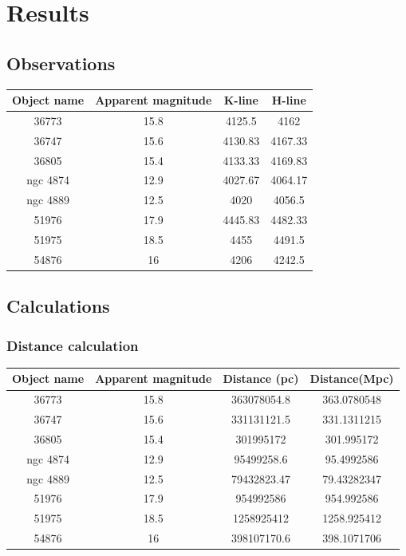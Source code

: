 \documentclass[letterpaper,11pt]{report}
\begin{document}
\section{Results}

\subsection{Observations}
\begin{center}
    \begin{tabular}{c|c|c|c}
        Object name & Apparent magnitude & K-line & H-line  \\ \hline 
        36773&	15.8&	4125.5&	4162 \\
        36747&	15.6&	4130.83	&4167.33 \\
        36805&	15.4&	4133.33&	4169.83 \\
        ngc 4874&	12.9&	4027.67&	4064.17 \\
        ngc 4889&	12.5&	4020&	4056.5 \\
        51976&	17.9&	4445.83&	4482.33 \\
        51975&	18.5&	4455&	4491.5 \\
        54876&	16&	4206&	4242.5 \\ 
    \end{tabular}
\end{center}

\subsection{Calculations}
\subsubsection{Distance calculation}
\begin{center}
    \begin{tabular}{c|c|c|c}
        Object name & Apparent magnitude & Distance (pc) & Distance(Mpc)  \\ \hline 
        36773 &	15.8 &	363078054.8 & 363.0780548 \\
        36747 &	15.6 &	331131121.5 & 331.1311215 \\
        36805 &	15.4 &	301995172 & 301.995172 \\
        ngc 4874 &	12.9 &	95499258.6 & 95.4992586 \\
        ngc 4889 &	12.5 &	79432823.47 & 79.43282347 \\
        51976 &	17.9 &	954992586 & 954.992586 \\
        51975 &	18.5 &	1258925412 & 1258.925412 \\
        54876 &	16 & 398107170.6 & 398.1071706 \\
    \end{tabular}
\end{center}
\end{document}

